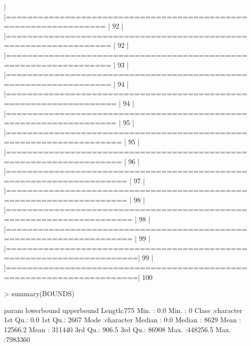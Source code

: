 \documentclass{article}
\begin{document}
\begin{Schunk}
\begin{Soutput}
  |                                                                            
  |================================================================      |  92%
  |                                                                            
  |=================================================================     |  92%
  |                                                                            
  |=================================================================     |  93%
  |                                                                            
  |=================================================================     |  94%
  |                                                                            
  |==================================================================    |  94%
  |                                                                            
  |==================================================================    |  95%
  |                                                                            
  |===================================================================   |  95%
  |                                                                            
  |===================================================================   |  96%
  |                                                                            
  |====================================================================  |  97%
  |                                                                            
  |====================================================================  |  98%
  |                                                                            
  |===================================================================== |  98%
  |                                                                            
  |===================================================================== |  99%
  |                                                                            
  |======================================================================|  99%
  |                                                                            
  |======================================================================| 100%
\end{Soutput}
\begin{Sinput}
> summary(BOUNDS)
\end{Sinput}
\begin{Soutput}
    param             lowerbound         upperbound     
 Length:775         Min.   :     0.0   Min.   :      0  
 Class :character   1st Qu.:     0.0   1st Qu.:   2667  
 Mode  :character   Median :     0.0   Median :   8629  
                    Mean   : 12566.2   Mean   : 311440  
                    3rd Qu.:   906.5   3rd Qu.:  86908  
                    Max.   :448256.5   Max.   :7983360  
\end{Soutput}
\end{Schunk}
\end{document}
